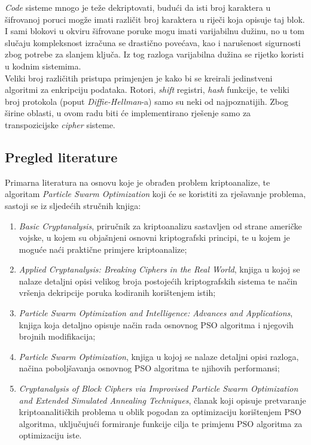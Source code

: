 \documentclass[12pt, a4paper]{article}
\begin{document}
\textit{Code} sisteme mnogo je teže dekriptovati, budući da isti broj karaktera u šifrovanoj poruci mogže imati različit broj karaktera u riječi koja opisuje taj blok. I sami blokovi u okviru šifrovane poruke mogu imati varijabilnu dužinu, no u tom slučaju kompleksnost izračuna se drastično povećava, kao i narušenost sigurnosti zbog potrebe za slanjem ključa. Iz tog razloga varijabilna dužina se rijetko koristi u kodnim sistemima. \cite{manual} \\

Veliki broj različitih pristupa primjenjen je kako bi se kreirali jedinstveni algoritmi za enkripciju podataka. Rotori, \textit{shift} registri, \textit{hash} funkcije, te veliki broj protokola (poput \textit{Diffie-Hellman}-a) samo su neki od najpoznatijih. Zbog širine oblasti, u ovom radu biti će implementirano rješenje samo za transpozicijske \textit{cipher} sisteme. 

\subsection{Pregled literature}

Primarna literatura na osnovu koje je obrađen problem kriptoanalize, te algoritam \textit{Particle Swarm Optimization} koji će se koristiti za rješavanje problema, sastoji se iz sljedećih stručnih knjiga:

\begin{enumerate}

\item \textit{Basic Cryptanalysis}, priručnik za kriptoanalizu sastavljen od strane američke vojske, u kojem su objašnjeni osnovni kriptografski principi, te u kojem je moguće naći praktične primjere kriptoanalize; \cite{manual}

\item \textit{Applied Cryptanalysis: Breaking Ciphers in the Real World}, knjiga u kojoj se nalaze detaljni opisi velikog broja postojećih kriptografskih sistema te način vršenja dekripcije poruka kodiranih korištenjem istih; \cite{cryptanalysis}

\item \textit{Particle Swarm Optimization and Intelligence: Advances and Applications}, knjiga koja detaljno opisuje način rada osnovnog PSO algoritma i njegovih brojnih modifikacija; \cite{pso}

\item \textit{Particle Swarm Optimization}, knjiga u kojoj se nalaze detaljni opisi razloga, načina poboljšavanja osnovnog PSO algoritma te njihovih performansi; \cite{pso2}

\item \textit{Cryptanalysis of Block Ciphers via Improvised Particle Swarm Optimization and Extended Simulated Annealing Techniques}, članak koji opisuje pretvaranje kriptoanalitičkih problema u oblik pogodan za optimizaciju korištenjem PSO algoritma, uključujući formiranje funkcije cilja te primjenu PSO algoritma za optimizaciju iste. \cite{cryptopso}

\end{enumerate}
\end{document}
